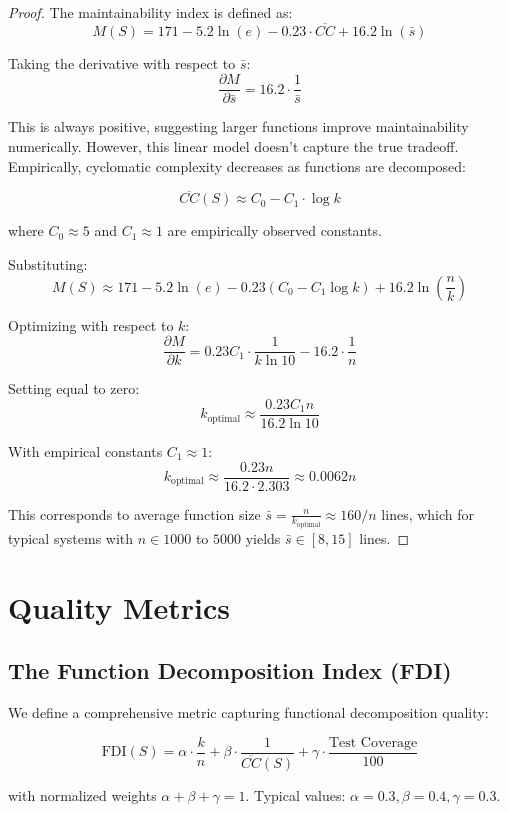 \documentclass[a4paper,12pt]{article}
\theoremstyle{definition}
\begin{document}
\begin{proof}
The maintainability index is defined as:
\[
M(S) = 171 - 5.2 \ln(e) - 0.23 \cdot \overline{CC} + 16.2 \ln(\bar{s})
\]

Taking the derivative with respect to $\bar{s}$:
\[
\frac{\partial M}{\partial \bar{s}} = 16.2 \cdot \frac{1}{\bar{s}}
\]

This is always positive, suggesting larger functions improve maintainability numerically. However, this linear model doesn't capture the true tradeoff. Empirically, cyclomatic complexity decreases as functions are decomposed:

\[
\overline{CC}(S) \approx C_0 - C_1 \cdot \log k
\]

where $C_0 \approx 5$ and $C_1 \approx 1$ are empirically observed constants.

Substituting:
\[
M(S) \approx 171 - 5.2 \ln(e) - 0.23(C_0 - C_1 \log k) + 16.2 \ln\left(\frac{n}{k}\right)
\]

Optimizing with respect to $k$:
\[
\frac{\partial M}{\partial k} = 0.23 C_1 \cdot \frac{1}{k \ln 10} - 16.2 \cdot \frac{1}{n}
\]

Setting equal to zero:
\[
k_{\text{optimal}} \approx \frac{0.23 C_1 n}{16.2 \ln 10}
\]

With empirical constants $C_1 \approx 1$:
\[
k_{\text{optimal}} \approx \frac{0.23 n}{16.2 \cdot 2.303} \approx 0.0062 n
\]

This corresponds to average function size $\bar{s} = \frac{n}{k_{\text{optimal}}} \approx 160 / n$ lines, which for typical systems with $n \in 1000$ to $5000$ yields $\bar{s} \in [8, 15]$ lines. \qedhere
\end{proof}

\section{Quality Metrics}

\subsection{The Function Decomposition Index (FDI)}

We define a comprehensive metric capturing functional decomposition quality:

\[
\mathrm{FDI}(S) = \alpha \cdot \frac{k}{n} + \beta \cdot \frac{1}{\overline{CC}(S)} + \gamma \cdot \frac{\text{Test Coverage}}{100}
\]

with normalized weights $\alpha + \beta + \gamma = 1$. Typical values: $\alpha = 0.3, \beta = 0.4, \gamma = 0.3$.
\end{document}
